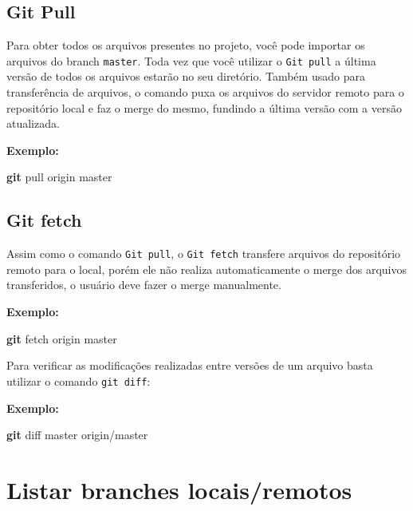 \documentclass[
  a5paper,
  pagesize,
  9pt,
  pointlessnumbers,
  normalheadings,
  twoside=false
]{book}
\newenvironment{Shaded}{\begin{snugshade}}{\end{snugshade}}
\newcommand{\KeywordTok}[1]{\textcolor[rgb]{0.13,0.29,0.53}{\textbf{{#1}}}}
\newcommand{\NormalTok}[1]{{#1}}
\begin{document}
\subsection{Git Pull}\label{git-pull}

Para obter todos os arquivos presentes no projeto, você pode importar os
arquivos do branch \texttt{master}. Toda vez que você utilizar o
\texttt{Git pull} a última versão de todos os arquivos estarão no seu
diretório. Também usado para transferência de arquivos, o comando puxa
os arquivos do servidor remoto para o repositório local e faz o merge do
mesmo, fundindo a última versão com a versão atualizada.

\textbf{Exemplo:}

\begin{Shaded}
\begin{Highlighting}[]
\KeywordTok{git} \NormalTok{pull origin master}
\end{Highlighting}
\end{Shaded}

\subsection{Git fetch}\label{git-fetch}

Assim como o comando \texttt{Git pull}, o \texttt{Git fetch} transfere
arquivos do repositório remoto para o local, porém ele não realiza
automaticamente o merge dos arquivos transferidos, o usuário deve fazer
o merge manualmente.

\textbf{Exemplo:}

\begin{Shaded}
\begin{Highlighting}[]
\KeywordTok{git} \NormalTok{fetch origin master}
\end{Highlighting}
\end{Shaded}

Para verificar as modificações realizadas entre versões de um arquivo
basta utilizar o comando \texttt{git diff}:

\textbf{Exemplo:}

\begin{Shaded}
\begin{Highlighting}[]
\KeywordTok{git} \NormalTok{diff master origin/master}
\end{Highlighting}
\end{Shaded}

\section{Listar branches
locais/remotos}\label{listar-branches-locaisremotos}
\end{document}

